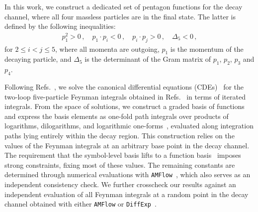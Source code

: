\documentclass[10pt,aps,prl,superscriptaddress,twocolumn,preprintnumbers,nofootinbib]{revtex4-2}
\begin{document}
In this work, we construct a dedicated set of pentagon functions for the decay channel, where all four massless particles are in the final state.
The latter is defined by the following inequalities:
\begin{align}
  p_1^2 >0 \,, \quad
  p_1 \cdot p_i < 0  \,, \quad
  p_i \cdot p_j > 0  \,, \quad \Delta_5 <0 \,,
\end{align}
for $2\le i < j \le 5$, where all momenta are outgoing, $p_1$ is the momentum of the decaying particle, and $\Delta_5$ is the determinant of the Gram matrix of $p_1$, $p_2$, $p_3$ and $p_4$.



Following Refs.~\cite{Chicherin:2021dyp,Abreu:2023rco}, we solve the canonical differential equations (CDEs)~\cite{Henn:2013pwa} for the two-loop five-particle Feynman integrals obtained in Refs.~\cite{Abreu:2020jxa,Abreu:2021smk,Abreu:2023rco} in terms of iterated integrals.
From the space of solutions, we construct a graded basis of functions and express the basis elements as one-fold path integrals over products of logarithms, dilogarithms, and logarithmic one-forms~\cite{Caron-Huot:2014lda}, evaluated along integration paths lying entirely within the decay region.
This construction relies on the values of the Feynman integrals at an arbitrary base point in the decay channel. The requirement that the symbol-level basis lifts to a function basis~\cite{Abreu:2023rco} imposes strong constraints, fixing most of these values. The remaining constants are determined through numerical evaluations with \texttt{AMFlow}~\cite{Liu:2017jxz,Liu:2022chg}, which also serves as an independent consistency check.
We further crosscheck our results against an independent evaluation of all Feynman integrals at a random point in the decay channel obtained with either \texttt{AMFlow} or \texttt{DiffExp}~\cite{Hidding:2020ytt}.
\end{document}
